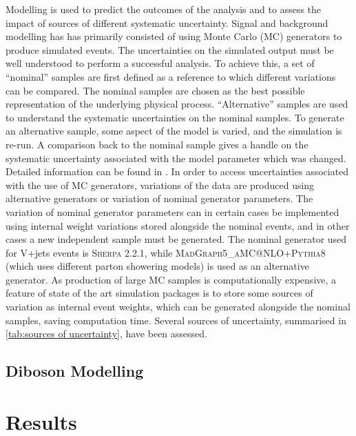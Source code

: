 Modelling is used to predict the outcomes of the analysis and to assess the impact of sources of different systematic uncertainty. Signal and background modelling has has primarily consisted of using Monte Carlo (MC) generators to produce simulated events. The uncertainties on the simulated output must be well understood to perform a successful analysis. To achieve this, a set of ``nominal'' samples are first defined as a reference to which different variations can be compared. The nominal samples are chosen as the best possible representation of the underlying physical process. ``Alternative'' samples are used to understand the systematic uncertainties on the nominal samples. To generate an alternative sample, some aspect of the model is varied, and the simulation is re-run. A comparison back to the nominal sample gives a handle on the systematic uncertainty associated with the model parameter which was changed. Detailed information can be found in \cite{Bell:2316951}. In order to access uncertainties associated with the use of MC generators, variations of the data are produced using alternative generators or variation of nominal generator parameters. The variation of nominal generator parameters can in certain cases be implemented using internal weight variations stored alongside the nominal events, and in other cases a new independent sample must be generated. The nominal generator used for V+jets events is \textsc{Sherpa 2.2.1}, while \textsc{MadGraph5\_aMC@NLO+Pythia8} (which uses different parton showering models) is used as an alternative generator. As production of large MC samples is computationally expensive, a feature of state of the art simulation packages is to store some sources of variation as internal event weights, which can be generated alongside the nominal samples, saving computation time. Several sources of uncertainty, summarised in \cref{tab:sources of uncertainty}, have been assessed.

%

%

\subsection{Diboson Modelling}



\section{Results}\label{sec:vhbb_results}

